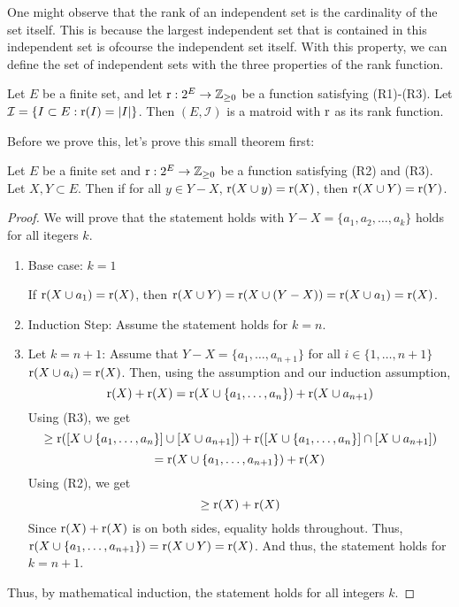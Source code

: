 One might observe that the rank of an independent set is the cardinality of the set itself. This is because the largest independent set that is contained in this independent set is ofcourse the independent set itself. With this property, we can define the set of independent sets with the three properties of the rank function.
\begin{theorem}
    Let $E$ be a finite set, and let $\text{r} : 2^E \rightarrow \mathbb{Z}_{\geq0}$ be a function satisfying (R1)-(R3). Let $\mathcal{I} = \{ I\subset E : \text{r}(I)=|I| \} $. Then $(E,\mathcal{I})$ is a matroid with $\text{r}$ as its rank function.
\end{theorem}
Before we prove this, let's prove this small theorem first:
\begin{theorem}
\label{rankextension}
    Let $E$ be a finite set and $\text{r}:2^E\rightarrow \mathbb{Z}_{\geq0}$ be a function satisfying (R2) and (R3). Let $X,Y\subset E$. Then if for all $y\in Y-X$, $\text{r}(X\cup y)=\text{r}(X)$, then $\text{r}(X\cup Y)=\text{r}(Y)$.
\end{theorem}
\begin{proof}
    We will prove that the statement holds with $Y-X = \{a_1,a_2,\dots,a_k\}$ holds for all itegers $k$.
    \begin{enumerate}
        \item Base case: $k=1$

        If $\text{r}(X\cup a_1)=\text{r}(X)$, then $\text{r}(X\cup Y)=\text{r}(X\cup(Y-X))=\text{r}(X\cup a_1)=\text{r}(X)$.
        \item Induction Step: Assume the statement holds for $k=n$.
        \item Let $k=n+1$: Assume that $Y-X=\{a_1,\dots,a_{n+1}\}$ for all $i\in\{1,\dots,n+1\}$ $\text{r}(X\cup a_i)=\text{r}(X)$. Then, using the assumption and our induction assumption, 
        $$ \text{r}(X)+\text{r}(X) = \text{r}(X\cup \{a_1,\dots,a_n\})+\text{r}(X\cup a_{n+1}) $$
        Using (R3), we get
        $$ \geq \text{r}([X\cup\{a_1,\dots,a_n\}]\cup [X\cup a_{n+1}]) + \text{r}([X\cup\{a_1,\dots,a_n\}]\cap [X\cup a_{n+1}]) $$
        $$ = \text{r}(X\cup\{a_1,\dots,a_{n+1}\}) + \text{r}(X) $$
        Using (R2), we get
        $$ \geq \text{r}(X)+\text{r}(X) $$
        Since $\text{r}(X)+\text{r}(X)$ is on both sides, equality holds throughout. Thus, $\text{r}(X\cup\{a_1,\dots,a_{n+1}\})=\text{r}(X\cup Y)=\text{r}(X)$. And thus, the statement holds for $k=n+1$.
    \end{enumerate}
    Thus, by mathematical induction, the statement holds for all integers $k$.
\end{proof}
